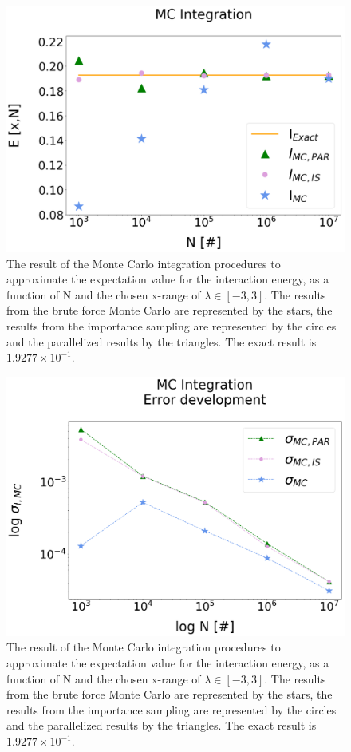 \documentclass[%
reprint,
amsmath,amssymb,
aps,
]{revtex4-1}
\begin{document}
\onecolumngrid

\begin{figure}[!h]
	\includegraphics[width=\textwidth]{MC_integration.png}
	\caption{\label{mc_err} The result of the Monte Carlo integration procedures to approximate the expectation value for the interaction energy, as a function of N and the chosen x-range of $\lambda \in[-3,3]$. The results from the brute force Monte Carlo are represented by the stars, the results from the importance sampling are represented by the circles and the parallelized results by the triangles. The exact result is $1.9277\times 10^{-1}$. }
\end{figure}

\begin{figure}[!h]
	\includegraphics[scale = 0.33]{MC_integration_error.png}
	\caption{\label{mc_pt} The result of the Monte Carlo integration procedures to approximate the expectation value for the interaction energy, as a function of N and the chosen x-range of $\lambda \in[-3,3]$. The results from the brute force Monte Carlo are represented by the stars, the results from the importance sampling are represented by the circles and the parallelized results by the triangles. The exact result is $1.9277\times 10^{-1}$. }
\end{figure}
\end{document}
